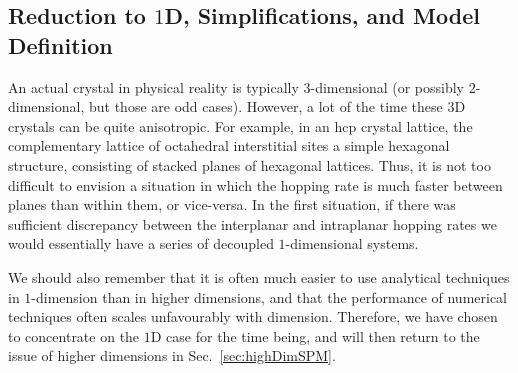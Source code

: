 \subsection{Reduction to $1$D, Simplifications, and Model Definition}
An actual crystal in physical reality is typically $3$-dimensional (or possibly $2$-dimensional, but those
are odd cases). However, a lot of the time these $3$D crystals can be quite anisotropic. For example, in
an hcp crystal lattice, the complementary lattice of octahedral interstitial sites a simple hexagonal
structure, consisting of stacked planes of hexagonal lattices. Thus, it is not too difficult to envision
a situation in which the hopping rate is much faster between planes than within them, or vice-versa. In the
first situation, if there was sufficient discrepancy between the interplanar and intraplanar hopping rates
we would essentially have a series of decoupled $1$-dimensional systems.

We should also remember that it is often much easier to use analytical techniques in $1$-dimension than
in higher dimensions, and that the performance of numerical techniques often scales unfavourably 
with dimension. Therefore, we have chosen to concentrate on the $1$D case for the time being, and will then
return to the issue of higher dimensions in Sec.~\ref{sec:highDimSPM}.

